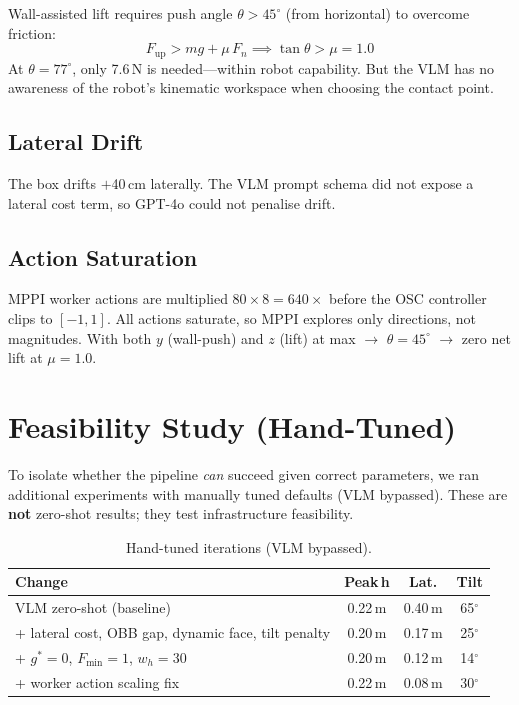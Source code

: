 \documentclass[10pt,twocolumn]{article}
\begin{document}
Wall-assisted lift requires push angle $\theta > 45^\circ$ (from horizontal) to overcome friction:
\begin{equation}
F_\text{up} > mg + \mu\, F_n \implies \tan\theta > \mu = 1.0
\end{equation}
At $\theta{=}77^\circ$, only 7.6\,N is needed---within robot capability. But the VLM has no awareness of the robot's kinematic workspace when choosing the contact point.

\subsection{Lateral Drift}

The box drifts $+$40\,cm laterally. The VLM prompt schema did not expose a lateral cost term, so GPT-4o could not penalise drift.

\subsection{Action Saturation}

MPPI worker actions are multiplied $80{\times}8{=}640\times$ before the OSC controller clips to $[-1,1]$. All actions saturate, so MPPI explores only directions, not magnitudes. With both $y$ (wall-push) and $z$ (lift) at max $\to$ $\theta{=}45^\circ$ $\to$ zero net lift at $\mu{=}1.0$.

\section{Feasibility Study (Hand-Tuned)}

To isolate whether the pipeline \emph{can} succeed given correct parameters, we ran additional experiments with manually tuned defaults (VLM bypassed). These are \textbf{not} zero-shot results; they test infrastructure feasibility.

\begin{table}[ht]
\centering\small
\caption{Hand-tuned iterations (VLM bypassed).}
\begin{tabular}{@{}p{3.5cm}ccc@{}}
\toprule
Change & Peak\,h & Lat. & Tilt \\
\midrule
VLM zero-shot (baseline) & 0.22\,m & 0.40\,m & 65$^\circ$ \\
\midrule
+ lateral cost, OBB gap, dynamic face, tilt penalty & 0.20\,m & 0.17\,m & 25$^\circ$ \\
+ $g^*{=}0$, $F_{\min}{=}1$, $w_h{=}30$ & 0.20\,m & 0.12\,m & 14$^\circ$ \\
+ worker action scaling fix & 0.22\,m & 0.08\,m & 30$^\circ$ \\
\bottomrule
\end{tabular}
\label{tab:handtuned}
\end{table}
\end{document}
